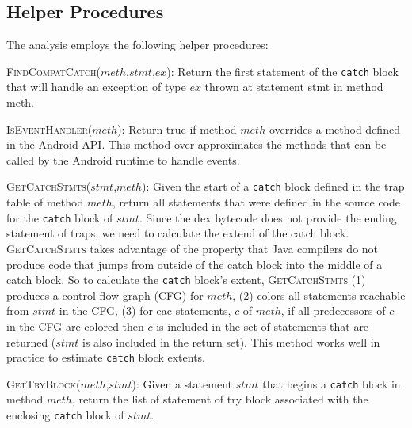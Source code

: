 \subsection{Helper Procedures}

The analysis employs the following helper procedures: 

\begin{description}[leftmargin=0cm,listparindent=0pt,itemindent=0cm]

\item \textsc{FindCompatCatch}($meth$,$stmt$,$ex$): Return the first
  statement of the \lstinline!catch! block that will handle an
  exception of type $ex$ thrown at statement stmt in method meth.

\item \textsc{IsEventHandler}($meth$): Return true if method $meth$
  overrides a method defined in the Android API.  This method
  over-approximates the methods that can be called by the Android
  runtime to handle events.

\item \textsc{GetCatchStmts}($stmt$,$meth$): Given the start of a
  \lstinline!catch! block defined in the trap table of method $meth$,
  return all statements that were defined in the source code for the
  \lstinline!catch! block of $stmt$.  Since the dex bytecode does not
  provide the ending statement of traps, we need to calculate the
  extend of the catch block.  \textsc{GetCatchStmts} takes advantage
  of the property that Java compilers do not produce code that jumps
  from outside of the catch block into the middle of a catch block.
  So to calculate the \lstinline!catch! block's extent,
  \textsc{GetCatchStmts} (1) produces a control flow graph (CFG) for
  $meth$, (2) colors all statements reachable from $stmt$ in the CFG,
  (3) for eac statements, $c$ of $meth$, if all predecessors of $c$ in
  the CFG are colored then $c$ is included in the set of statements
  that are returned ($stmt$ is also included in the return set). This
  method works well in practice to estimate \lstinline!catch! block
  extents.

\item \textsc{GetTryBlock}($meth$,$stmt$): Given a statement $stmt$
  that begins a \lstinline!catch! block in method $meth$, return the
  list of statement of try block associated with the enclosing
  \lstinline!catch! block of $stmt$.

\end{description}

